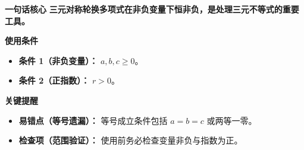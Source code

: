 \begin{summarybox}
\textbf{\textcolor{CSummary}{一句话核心}}
\textbf{三元对称轮换多项式在非负变量下恒非负，是处理三元不等式的重要工具。}

\medskip
\textbf{\textcolor{CSummary}{使用条件}}
\begin{itemize}[leftmargin=*, itemsep=0.5em, topsep=0.4em]
    \item \textbf{条件 1（非负变量）：} $a, b, c \ge 0$。
    \item \textbf{条件 2（正指数）：} $r > 0$。
\end{itemize}

\medskip
\textbf{\textcolor{CSummary}{关键提醒}}
\begin{itemize}[leftmargin=*, itemsep=0.5em, topsep=0.4em]
    \item \textbf{易错点（等号遗漏）：} 等号成立条件包括 $a=b=c$ 或两等一零。
    \item \textbf{检查项（范围验证）：} 使用前务必检查变量非负与指数为正。
\end{itemize}
\end{summarybox}

